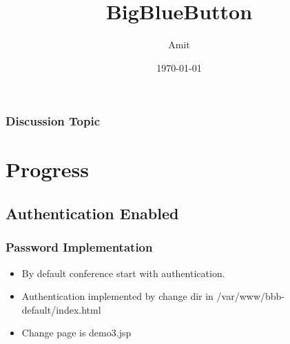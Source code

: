 \documentclass{beamer}
\title[BBB]{BigBlueButton} %
\author{Amit} %
\institute[Indian Institute of Technology] %
{
IITB \\ %
\medskip
\textit{shriamit1@gmal.com} %
}
\date{\today} %
\begin{document}
\begin{frame}
\titlepage  %
\end{frame}

\begin{frame}
\frametitle{Discussion Topic} %
\tableofcontents %
\end{frame}


\section{Progress} %

\subsection{Authentication Enabled} %

\begin{frame}
\frametitle{Password Implementation}
\begin{itemize}

\item By default conference start with authentication.\pause
\item Authentication implemented by change dir in /var/www/bbb-default/index.html\pause
\item Change page is demo3.jsp 
\end{itemize}
\end{frame}
\end{document}
